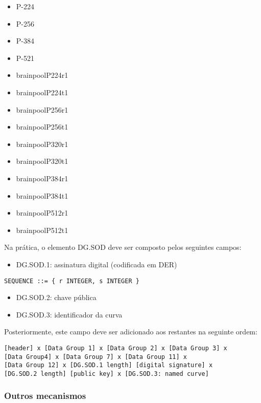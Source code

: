 \begin{multicols}{2}
\begin{itemize}
\item P-224
\item P-256
\item P-384
\item P-521
\item brainpoolP224r1
\item brainpoolP224t1
\item brainpoolP256r1
\item brainpoolP256t1
\item brainpoolP320r1
\item brainpoolP320t1
\item brainpoolP384r1
\item brainpoolP384t1
\item brainpoolP512r1
\item brainpoolP512t1
\end{itemize}
\end{multicols}

Na prática, o elemento DG.SOD deve ser composto pelos seguintes campos:

\begin{itemize}
\item DG.SOD.1: assinatura digital (codificada em DER)
\end{itemize}
\begin{Verbatim}
SEQUENCE ::= { r INTEGER, s INTEGER }
\end{Verbatim}
\begin{itemize}
\item DG.SOD.2: chave pública
\item DG.SOD.3: identificador da curva
\end{itemize}

Posteriormente, este campo deve ser adicionado aos restantes na seguinte
ordem: 

\begin{Verbatim}
[header] x [Data Group 1] x [Data Group 2] x [Data Group 3] x 
[Data Group4] x [Data Group 7] x [Data Group 11] x 
[Data Group 12] x [DG.SOD.1 length] [digital signature] x 
[DG.SOD.2 length] [public key] x [DG.SOD.3: named curve]
\end{Verbatim}


\subsubsection{Outros mecanismos}

